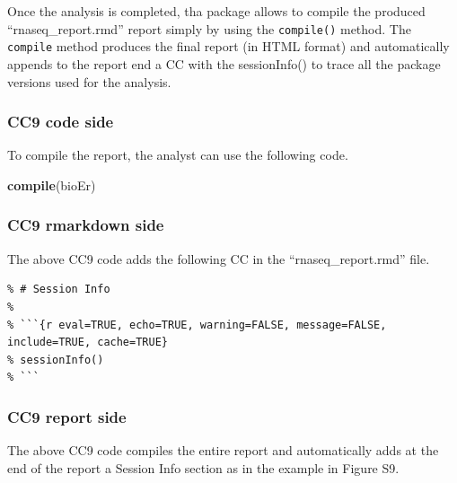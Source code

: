 \documentclass[]{article}
\newenvironment{Shaded}{\begin{snugshade}}{\end{snugshade}}
\newcommand{\KeywordTok}[1]{\textcolor[rgb]{0.13,0.29,0.53}{\textbf{#1}}}
\newcommand{\NormalTok}[1]{#1}
\begin{document}
Once the analysis is completed, tha package allows to compile the
produced ``rnaseq\_report.rmd'' report simply by using the
\texttt{compile()} method. The \texttt{compile} method produces the
final report (in HTML format) and automatically appends to the report
end a CC with the sessionInfo() to trace all the package versions used
for the analysis.

\hypertarget{cc9-code-side}{%
\subsubsection{CC9 code side}\label{cc9-code-side}}

To compile the report, the analyst can use the following code.

\begin{Shaded}
\begin{Highlighting}[]
\KeywordTok{compile}\NormalTok{(bioEr)}
\end{Highlighting}
\end{Shaded}

\newpage

\hypertarget{cc9-rmarkdown-side}{%
\subsubsection{CC9 rmarkdown side}\label{cc9-rmarkdown-side}}

The above CC9 code adds the following CC in the ``rnaseq\_report.rmd''
file.

\begin{verbatim}
% # Session Info
% 
% ```{r eval=TRUE, echo=TRUE, warning=FALSE, message=FALSE, include=TRUE, cache=TRUE}
% sessionInfo()
% ```
\end{verbatim}

\hypertarget{cc9-report-side}{%
\subsubsection{CC9 report side}\label{cc9-report-side}}

The above CC9 code compiles the entire report and automatically adds at
the end of the report a Session Info section as in the example in Figure
S9.
\end{document}
